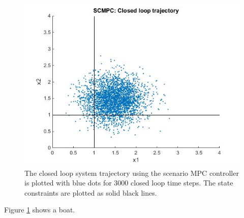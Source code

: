 \documentclass[12 pt]{report}
\begin{document}
\begin{figure}
	\includegraphics[width=\linewidth]{SCMPC_3000.jpg}
	\caption{The closed loop system trajectory using the scenario MPC controller is plotted with blue dots for 3000 closed loop time steps. The state constraints are plotted as solid black lines.}
	\label{fig:SCMPC_3000}
\end{figure}

Figure \ref{fig:SCMPC_3000} shows a boat.
\end{document}
